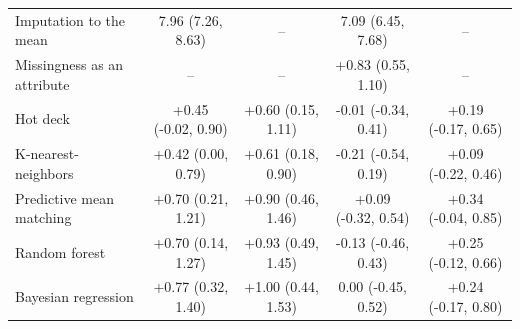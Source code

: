 \documentclass{article}
\begin{document}
\begin{table}
\begin{tabular}{lcccc}
\midrule
Imputation to the mean & 7.96 (7.26, 8.63) & -- & 7.09 (6.45, 7.68) & -- \\ 
Missingness as an attribute & -- & -- & +0.83 (0.55, 1.10) & -- \\ 
Hot deck & +0.45 (-0.02, 0.90) & +0.60 (0.15, 1.11) & -0.01 (-0.34, 0.41) & +0.19 (-0.17, 0.65) \\ 
K-nearest-neighbors & +0.42 (0.00, 0.79) & +0.61 (0.18, 0.90) & -0.21 (-0.54, 0.19) & +0.09 (-0.22, 0.46) \\ 
Predictive mean matching & +0.70 (0.21, 1.21) & +0.90 (0.46, 1.46) & +0.09 (-0.32, 0.54) & +0.34 (-0.04, 0.85) \\ 
Random forest & +0.70 (0.14, 1.27) & +0.93 (0.49, 1.45) & -0.13 (-0.46, 0.43) & +0.25 (-0.12, 0.66) \\ 
Bayesian regression & +0.77 (0.32, 1.40) & +1.00 (0.44, 1.53) & 0.00 (-0.45, 0.52) & +0.24 (-0.17, 0.80) \\ 
\bottomrule
\end{tabular} 
 \end{table}

\clearpage
\end{document}
